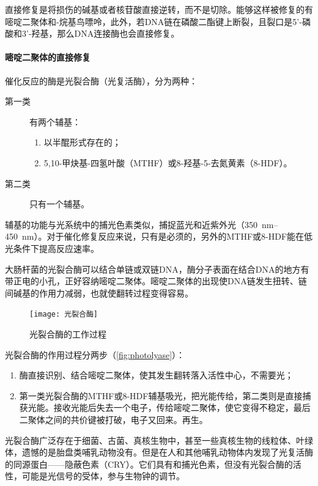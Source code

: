 直接修复是将损伤的碱基或者核苷酸直接逆转，而不是切除。能够这样被修复的有嘧啶二聚体和-烷基鸟嘌呤，此外，若DNA链在磷酸二酯键上断裂，且裂口是5'-磷酸和3'-羟基，那么DNA连接酶也会直接修复。

\paragraph{嘧啶二聚体的直接修复}

催化反应的酶是光裂合酶（光复活酶），分为两种：\begin{description}
	\item[第一类] 有两个辅基：\begin{enumerate}
		\item 以半醌形式存在的；
		\item 5,10-甲炔基-四氢叶酸（MTHF）或8-羟基-5-去氮黄素（8-HDF）。
	\end{enumerate}
	\item[第二类] 只有一个辅基。
\end{description}
辅基的功能与光系统中的捕光色素类似，捕捉蓝光和近紫外光（\qtyrange{350}{450}{\nano\meter}）。对于催化修复反应来说，只有是必须的，另外的MTHF或8-HDF能在低光条件下提高反应速率。

大肠杆菌的光裂合酶可以结合单链或双链DNA，酶分子表面在结合DNA的地方有带正电的小孔，正好容纳嘧啶二聚体。嘧啶二聚体的出现使DNA链发生扭转、链间碱基的作用力减弱，也就使翻转过程变得容易。

\begin{figure}
	\centering
	\texttt{[image: 光裂合酶]}
	\caption{光裂合酶的工作过程}
	\label{fig:photolyase}
\end{figure}

光裂合酶的作用过程分两步（\autoref{fig:photolyase}）：\begin{enumerate}
	\item 酶直接识别、结合嘧啶二聚体，使其发生翻转落入活性中心，不需要光；
	\item 第一类光裂合酶的MTHF或8-HDF辅基吸光，把光能传给，第二类则是直接捕获光能。接收光能后失去一个电子，传给嘧啶二聚体，使它变得不稳定，最后二聚体之间的共价键被打破，电子又回来。再生。
\end{enumerate}

光裂合酶广泛存在于细菌、古菌、真核生物中，甚至一些真核生物的线粒体、叶绿体，遗憾的是胎盘类哺乳动物没有。但是在人和其他哺乳动物体内发现了光复活酶的同源蛋白——隐蔽色素（CRY）。它们具有和捕光色素，但没有光裂合酶的活性，可能是光信号的受体，参与生物钟的调节。

